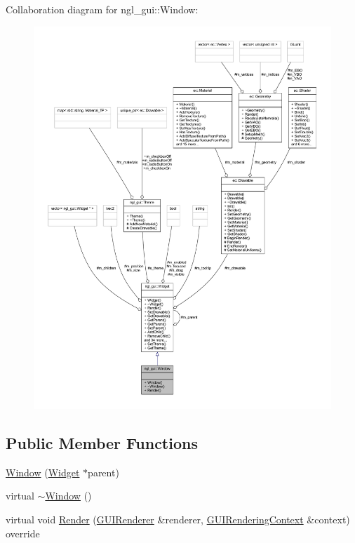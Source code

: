 Collaboration diagram for ngl\+\_\+gui\+:\+:Window\+:
\nopagebreak
\begin{figure}[H]
\begin{center}
\leavevmode
\includegraphics[width=350pt]{classngl__gui_1_1_window__coll__graph}
\end{center}
\end{figure}
\subsection*{Public Member Functions}
\begin{DoxyCompactItemize}
\item 
\mbox{\hyperlink{classngl__gui_1_1_window_a9452892046557b3f69be35d39452555e}{Window}} (\mbox{\hyperlink{classngl__gui_1_1_widget}{Widget}} $\ast$parent)
\item 
virtual \mbox{\hyperlink{classngl__gui_1_1_window_aae2fd5adcc13da2f7aabb75d77376cbe}{$\sim$\+Window}} ()
\item 
virtual void \mbox{\hyperlink{classngl__gui_1_1_window_ad79a7c2a639f6bb245540fa8a932f4b1}{Render}} (\mbox{\hyperlink{classngl__gui_1_1_g_u_i_renderer}{G\+U\+I\+Renderer}} \&renderer, \mbox{\hyperlink{classngl__gui_1_1_g_u_i_rendering_context}{G\+U\+I\+Rendering\+Context}} \&context) override
\end{DoxyCompactItemize}
